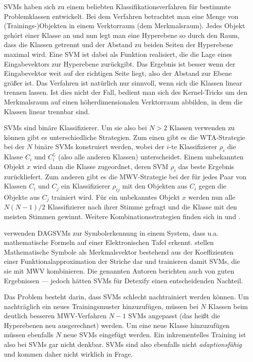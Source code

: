\ac{SVM}s \cite{kernels} haben sich zu einem beliebten Klassifikationsverfahren für bestimmte Problemklassen entwickelt. Bei dem Verfahren betrachtet man eine Menge von (Trainings-)Objekten in einem Verktorraum (dem Merkmalsraum). Jedes Objekt gehört einer Klasse an und nun legt man eine Hyperebene so durch den Raum, dass die Klassen getrennt und der Abstand zu beiden Seiten der Hyperebene maximal wird. Eine SVM ist dabei als Funktion realisiert, die die Lage eines Eingabevektors zur Hyperebene zurückgibt. Das Ergebnis ist besser wenn der Eingabevektor weit auf der richtigen Seite liegt, also der Abstand zur Ebene größer ist. Das Verfahren ist natürlich nur sinnvoll, wenn sich die Klassen linear trennen lassen. Ist dies nicht der Fall, bedient man sich des Kernel-Tricks \cite[S.15]{kernels} um den Merkmalsraum auf einen höherdimensionalen Verktorraum abbilden, in dem die Klassen linear trennbar sind.

\ac{SVM}s sind binäre Klassifizierer. Um sie also bei $N>2$ Klassen verwenden zu können gibt es unterschiedliche Strategien. Zum einen gibt es die \ac{WTA}-Strategie bei der $N$ binäre SVMs konstruiert werden, wobei der $i$-te Klassifizierer $\rho_i$ die Klasse $C_i$ und $C_i^{\complement}$ (also alle anderen Klassen) unterscheidet. Einem unbekannten Objekt $x$ wird dann die Klasse zugeordnet, deren SVM $\rho_i$ das beste Ergebnis zurückliefert. Zum anderen gibt es die \ac{MWV}-Strategie bei der für jedes Paar von Klassen $C_i$ und $C_j$ ein Klassifizierer $\rho_{ij}$ mit den Objekten aus $C_i$ gegen die Objekte aus $C_j$ trainiert wird. Für ein unbekanntes Objekt $x$ werden nun alle $N(N-1)/2$ Klassifizierer nach ihrer Stimme gefragt und die Klasse mit den meisten Stimmen gewinnt. Weitere Kombinationsstrategien finden sich in \cite{Duan:2005p11426} und \cite{Platt:2000p11488}.

\citet{Tapia:2003p11202,Tapia:2005p11236} verwenden \ac{DAGSVM}s \cite{Platt:2000p11488} zur Symbolerkennung in einem System, dass u.a. mathematische Formeln auf einer Elektronischen Tafel erkennt.
\citet{Golubitsky:2009p2456,Keshari:2008p528,Golubitsky:2009p2321} stellen Mathematische Symbole als Merkmalsvektor bestehend aus der Koeffizienten einer Funktionalapproximation der Striche dar und trainieren damit \ac{SVM}s, die sie mit \ac{MWV} kombinieren. Die genannten Autoren berichten auch von guten Ergebnissen — jedoch hätten \ac{SVM}s für Detexify einen entscheidenden Nachteil.

Das Problem besteht darin, dass SVMs schlecht nachtrainiert werden können. Um nachträglich ein neues Trainingsmuster hinzuzufügen, müssen bei $N$ Klassen beim deutlich besseren MWV-Verfahren \cite{Duan:2005p11426} $N-1$ SVMs angepasst (das heißt die Hyperebenen neu ausgerechnet) werden. Um eine neue Klasse hinzuzufügen müssen ebenfalls $N$ neue SVMs eingefügt werden. Ein inkrementelles Training ist also bei SVMs gar nicht denkbar. SVMs sind also ebenfalls nicht \emph{adaptionsfähig} und kommen daher nicht wirklich in Frage.

